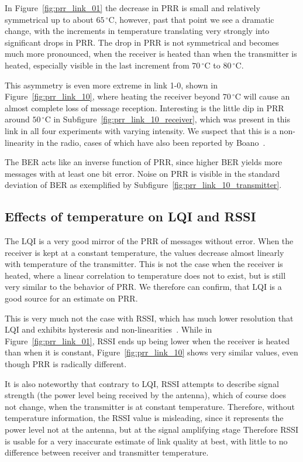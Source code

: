 In Figure~\ref{fig:prr_link_01} the decrease in \ac{PRR} is small and relatively symmetrical up to about $65\,^{\circ}\mathrm{C}$, however, past that point we see a dramatic change, with the increments in temperature translating very strongly into significant drops in \ac{PRR}.
The drop in \ac{PRR} is not symmetrical and becomes much more pronounced, when the receiver is heated than when the transmitter is heated, especially visible in the last increment from $70\,^{\circ}\mathrm{C}$ to $80\,^{\circ}\mathrm{C}$.

This asymmetry is even more extreme in link 1-0, shown in Figure~\ref{fig:prr_link_10}, where heating the receiver beyond $70\,^{\circ}\mathrm{C}$ will cause an almost complete loss of message reception.
Interesting is the little dip in \ac{PRR} around $50\,^{\circ}\mathrm{C}$ in Subfigure~\ref{fig:prr_link_10_receiver}, which was present in this link in all four experiments with varying intensity. We suspect that this is a non-linearity in the radio, cases of which have also been reported by Boano~\etal.

The \ac{BER} acts like an inverse function of \ac{PRR}, since higher \ac{BER} yields more messages with at least one bit error.
Noise on \ac{PRR} is visible in the standard deviation of \ac{BER} as exemplified by Subfigure~\ref{fig:prr_link_10_transmitter}.

\subsection{Effects of temperature on \acs{LQI} and \acs{RSSI}}

The \ac{LQI} is a very good mirror of the \ac{PRR} of messages without error.
When the receiver is kept at a constant temperature, the values decrease almost linearly with temperature of the transmitter.
This is not the case when the receiver is heated, where a linear correlation to temperature does not to exist, but is still very similar to the behavior of \ac{PRR}.
We therefore can confirm, that \ac{LQI} is a good source for an estimate on \ac{PRR}.

This is very much not the case with \ac{RSSI}, which has much lower resolution that \ac{LQI} and exhibits hysteresis and non-linearities~\cite{Boano2013}.
While in Figure~\ref{fig:prr_link_01}, \ac{RSSI} ends up being lower when the receiver is heated than when it is constant, Figure~\ref{fig:prr_link_10} shows very similar values, even though \ac{PRR} is radically different.

It is also noteworthy that contrary to \ac{LQI}, \ac{RSSI} attempts to describe signal strength (\ie the power level being received by the antenna), which of course does not change, when the transmitter is at constant temperature.
Therefore, without temperature information, the \ac{RSSI} value is misleading, since it represents the power level not at the antenna, but at the signal amplifying stage 
Therefore \ac{RSSI} is usable for a very inaccurate estimate of link quality at best, with little to no difference between receiver and transmitter temperature.

